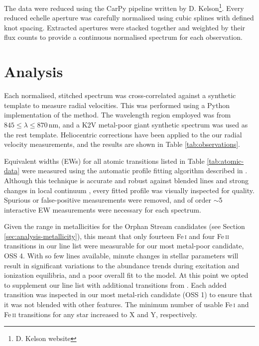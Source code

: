 \documentclass{emulateapj}
\begin{document}

The data were reduced using the CarPy pipeline written by D. Kelson\footnote{D. Kelson website}. Every reduced echelle aperture was carefully normalised using cubic splines with defined knot spacing. Extracted apertures were stacked together and weighted by their flux counts to provide a continuous normalised spectrum for each observation.


\section{Analysis}
\label{sec:analysis}
Each normalised, stitched spectrum was cross-correlated against a synthetic template to measure radial velocities. This was performed using a Python implementation of the \citet{Tonry;Davis_1978} method. The wavelength region employed was from $845 \leq \lambda \leq 870$\,nm, and a K2V metal-poor giant synthetic spectrum was used as the rest template. Heliocentric corrections have been applied to the our radial velocity measurements, and the results are shown in Table \ref{tab:observations}.


Equivalent widths (EWs) for all atomic transitions listed in Table \ref{tab:atomic-data} were measured using the automatic profile fitting algorithm described in \citet{casey;et-al_2013b}. Although this technique is accurate and robust against blended lines and strong changes in local continuum \citep{frebel;et-al_2013a,casey;et-al_2013b,keller;et-al_2013,frebel;et-al_2013c}, every fitted profile was visually inspected for quality. Spurious or false-positive measurements were removed, and of order $\sim$5 interactive EW measurements were necessary for each spectrum.

Given the range in metallicities for the Orphan Stream candidates (see Section \ref{sec:analysis-metallicity}), this meant that only fourteen Fe\,\textsc{i} and four Fe\,\textsc{ii} transitions in our line list were measurable for our most metal-poor candidate, OSS 4. With so few lines available, minute changes in stellar parameters will result in significant variations to the abundance trends during excitation and ionization equilibria, and a poor overall fit to the model. At this point we opted to supplement our line list with additional transitions from \citet{roederer;et-al_2010}. Each added transition was inspected in our most metal-rich candidate (OSS 1) to ensure that it was not blended with other features. The minimum number of usable Fe\,\textsc{i} and Fe\,\textsc{ii} transitions for any star increased to X and Y, respectively.
\end{document}
